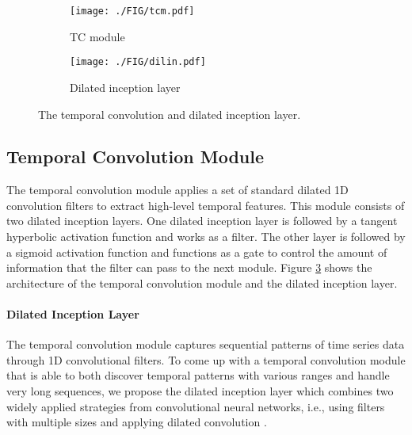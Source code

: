 \documentclass[sigconf]{acmart}
\begin{document}
\begin{figure}
        \begin{subfigure}[b]{0.23\textwidth}   
            \centering 
            \texttt{[image: ./FIG/tcm.pdf]}
            \caption[TC module]{{\small TC module}}    
            \label{fig:tcm}
        \end{subfigure}
        \hfill
        \begin{subfigure}[b]{0.23\textwidth}   
            \centering 
            \texttt{[image: ./FIG/dilin.pdf]}
            \caption[Dilated inception layer]{{\small Dilated inception layer}}    
            \label{fig:dil}
        \end{subfigure}
        \caption[Temporal convolution module and dilated inception layer.]
        {\small The temporal convolution and dilated inception layer.} 
        \label{fig:tc}
\end{figure}
\subsection{Temporal Convolution  Module}
The temporal convolution module applies a set of standard dilated 1D convolution filters to extract high-level temporal features. This module consists of two dilated inception layers. One dilated inception layer is  followed by a tangent hyperbolic activation function and works as a filter. The other layer is followed by a sigmoid activation function and functions as a gate to control the amount of information that the filter can pass to the next module. Figure \ref{fig:tc} shows the architecture of the temporal convolution module and the dilated inception layer. 

\paragraph{Dilated Inception Layer}
The temporal convolution module captures sequential patterns of time series data through 1D convolutional filters. To come up with a temporal convolution module that is able to both discover temporal patterns with various ranges and handle very long sequences, we propose the dilated inception layer which combines two widely applied strategies from convolutional neural networks, i.e., using filters with multiple sizes \cite{szegedy2015going} and applying dilated convolution \cite{yu2016multi}.
\end{document}
